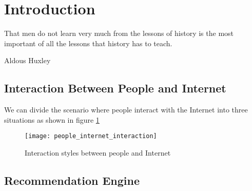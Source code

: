 \section{Introduction}
\label{ch:intro}

\epigraph{That men do not learn very much from the lessons of history is the most important of all the lessons that history has to teach.}{Aldous Huxley}

\subsection{Interaction Between People and Internet}
We can divide the scenario where people interact with the Internet into three situations as shown in figure \ref{figure:1}

\begin{figure}[h]
\caption{Interaction styles between people and Internet}
\label{figure:1}
\centering
\texttt{[image: people\_internet\_interaction]}
\end{figure}

\subsection{Recommendation Engine}

\cleardoublepage